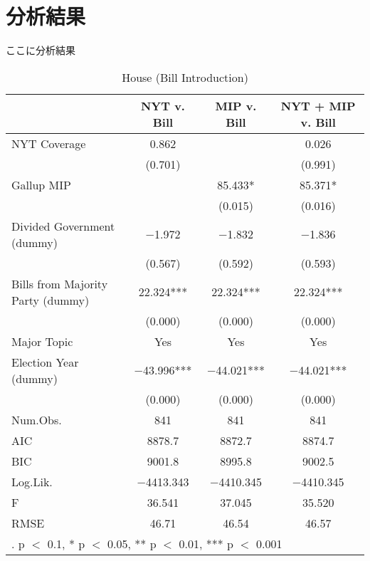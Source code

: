 \documentclass[here]{article}
\begin{document}
\section{分析結果}
ここに分析結果


\begin{table}[h]
  \caption{House (Bill Introduction)}
  \hspace{-1cm}

  \begin{tabular}[t]{lccc}
    \toprule
      & NYT v. Bill & MIP v. Bill & NYT + MIP v. Bill\\
    \midrule
    NYT Coverage & \num{0.862} &  & \num{0.026}\\
    & (\num{0.701}) &  & (\num{0.991})\\
    Gallup MIP &  & \num{85.433}* & \num{85.371}*\\
    &  & (\num{0.015}) & (\num{0.016})\\
    Divided Government (dummy) & \num{-1.972} & \num{-1.832} & \num{-1.836}\\
    & (\num{0.567}) & (\num{0.592}) & (\num{0.593})\\
    Bills from Majority Party (dummy) & \num{22.324}*** & \num{22.324}*** & \num{22.324}***\\
    & (\num{0.000}) & (\num{0.000}) & \vphantom{1} (\num{0.000})\\
    Major Topic & Yes & Yes & Yes\\
    Election Year (dummy) & \num{-43.996}*** & \num{-44.021}*** & \num{-44.021}***\\
    & (\num{0.000}) & (\num{0.000}) & (\num{0.000})\\
    Num.Obs. & \num{841} & \num{841} & \num{841}\\
    \midrule
    AIC & \num{8878.7} & \num{8872.7} & \num{8874.7}\\
    BIC & \num{9001.8} & \num{8995.8} & \num{9002.5}\\
    Log.Lik. & \num{-4413.343} & \num{-4410.345} & \num{-4410.345}\\
    F & \num{36.541} & \num{37.045} & \num{35.520}\\
    RMSE & \num{46.71} & \num{46.54} & \num{46.57}\\
    \bottomrule
    \multicolumn{4}{l}{\rule{0pt}{1em}. p $<$ 0.1, * p $<$ 0.05, ** p $<$ 0.01, *** p $<$ 0.001}\\
  \end{tabular}
\end{table}
\end{document}
